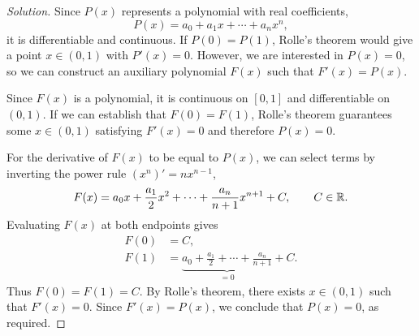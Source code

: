 \begin{proof}[Solution]
  Since $P(x)$ represents a polynomial with real coefficients,
  \[
    P(x)=a_0+a_1x+\cdots+a_nx^n,
  \]
  it is differentiable and continuous.
  If $P(0)=P(1)$, Rolle's theorem would give a
  point $x\in(0,1)$ with $P'(x)=0$. However, we are interested in
  $P(x)=0$, so we can construct an auxiliary polynomial $F(x)$
  such that $F'(x)=P(x)$.

  Since $F(x)$ is a polynomial, it is continuous on $[0,1]$ and
  differentiable on $(0,1)$. If we can establish that $F(0)=F(1)$,
  Rolle's theorem guarantees some $x\in(0,1)$ satisfying
  $F'(x)=0$ and therefore $P(x)=0$.

  For the derivative of $F(x)$ to be equal to $P(x)$, we can select
  terms by inverting the power rule $(x^n)'=nx^{n-1}$,
  \[
    F(x)=a_0x+\frac{a_1}{2}x^2+\cdots+
      \frac{a_n}{n+1}x^{n+1}+C,\qquad C\in\mathbb{R}.
  \]
  Evaluating $F(x)$ at both endpoints gives
  \[
    \begin{aligned}
      F(0)&=C,\\
      F(1)&=\underbrace{a_0+\frac{a_1}{2}+\cdots+
        \frac{a_n}{n+1}}_{=0}+C.
    \end{aligned}
  \]
  Thus $F(0)=F(1)=C$. By Rolle's theorem, there exists
  $x\in(0,1)$ such that $F'(x)=0$. Since $F'(x)=P(x)$, we conclude
  that $P(x)=0$, as required.
\end{proof}
